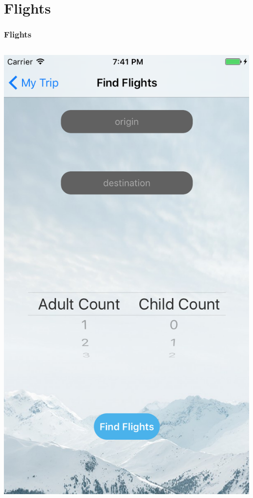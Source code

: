 \documentclass{beamer}
\begin{document}
\section{Flights}
\begin{frame}
\frametitle{Flights}
\begin{columns}
    \begin{column}{0.3\textwidth}
        \begin{center}
            \includegraphics[scale=0.3]{flightSearch}

\end{center}
\end{column}
\end{columns}
\end{frame}
\end{document}
